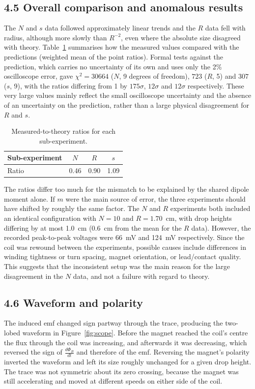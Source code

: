 \documentclass[11pt]{article}
\begin{document}
\subsection*{4.5 Overall comparison and anomalous results}
The $N$ and $s$ data followed approximately linear trends and the $R$ data fell with radius, although more slowly than $R^{-2}$, even where the absolute size disagreed with theory. Table~\ref{tab:ratios} summarises how the measured values compared with the predictions (weighted mean of the point ratios). Formal tests against the prediction, which carries no uncertainty of its own and uses only the 2\% oscilloscope error, gave $\chi^2 = 30664$ ($N$, 9 degrees of freedom), $723$ ($R$, 5) and $307$ ($s$, 9), with the ratios differing from 1 by $175\sigma$, $12\sigma$ and $12\sigma$ respectively. These very large values mainly reflect the small oscilloscope uncertainty and the absence of an uncertainty on the prediction, rather than a large physical disagreement for $R$ and $s$.

\begin{table}
\centering
\caption{Measured-to-theory ratios for each sub-experiment.}
\label{tab:ratios}
\begin{tabular}{lccc}
\toprule
Sub-experiment & $N$ & $R$ & $s$ \\
\midrule
Ratio & 0.46 & 0.90 & 1.09 \\
\bottomrule
\end{tabular}
\end{table}

The ratios differ too much for the mismatch to be explained by the shared dipole moment alone. If $m$ were the main source of error, the three experiments should have shifted by roughly the same factor.
The $N$ and $R$ experiments both included an identical configuration with $N=10$ and $R=1.70$~cm, with drop heights differing by at most 1.0~cm (0.6~cm from the mean for the $R$ data). However, the recorded peak-to-peak voltages were 66~mV and 124~mV respectively. Since the coil was rewound between the experiments, possible causes include differences in winding tightness or turn spacing, magnet orientation, or lead/contact quality. This suggests that the inconsistent setup was the main reason for the large disagreement in the $N$ data, and not a failure with regard to theory.
\subsection*{4.6 Waveform and polarity}
The induced emf changed sign partway through the trace, producing the two-lobed waveform in Figure~\ref{fig:scope}. Before the magnet reached the coil's centre the flux through the coil was increasing, and afterwards it was decreasing, which reversed the sign of $\frac{d\Phi_B}{dt}$ and therefore of the emf. Reversing the magnet's polarity inverted the waveform and left its size roughly unchanged for a given drop height. The trace was not symmetric about its zero crossing, because the magnet was still accelerating and moved at different speeds on either side of the coil.
\end{document}
